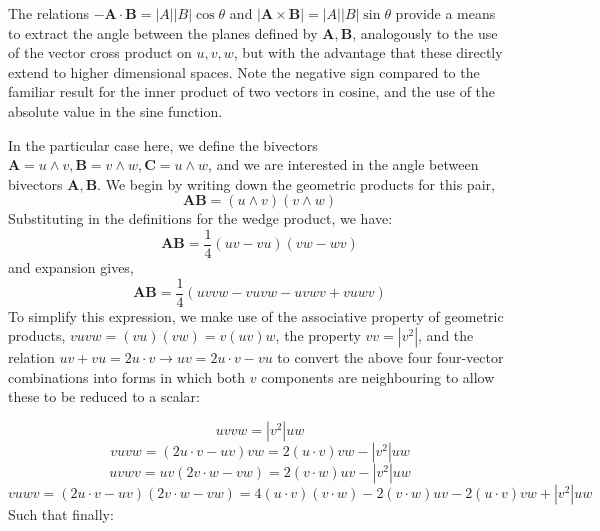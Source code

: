 \documentclass[11pt]{article} %
\begin{document}
The relations $ - \mathbf{A} \cdot \mathbf{B} = |A| |B| \cos \theta$ and  $  | \mathbf{A} \times \mathbf{B}| = |A| |B| \sin \theta$ provide a means to extract the angle between the planes defined by $\mathbf{A}, \mathbf{B}$, analogously to the use of the vector cross product on $u,v,w$, but with the advantage that these directly extend to higher dimensional spaces.  Note the negative sign compared to the familiar result for the inner product of two vectors in cosine, and the use of the absolute value in the sine function. 

In the particular case here, we define the bivectors $\mathbf{A} = u \wedge v, \mathbf{B} = v \wedge w, \mathbf{C} = u \wedge w$, and we are interested in the angle between bivectors $\mathbf{A}, \mathbf{B}$. We begin by writing down the geometric products for this pair,
\begin{equation}
\mathbf{A} \mathbf{B} = (u \wedge v) (v \wedge w) 
\end{equation}
Substituting in the definitions for the wedge product, we have:
\begin{equation}
\mathbf{A} \mathbf{B} = \frac{1}{4} (uv - vu) (vw - wv) 
\end{equation}
and expansion gives,
\begin{equation}
\mathbf{A} \mathbf{B} = \frac{1}{4}  (uvvw - vuvw - uvwv + vuwv)  
\end{equation}
To simplify this expression, we make use of the associative property of geometric products, $vuvw = (vu)(vw) = v(uv)w$, the property $vv = |v^2|$, and the relation $uv + vu = 2 u \cdot v \rightarrow uv = 2 u \cdot v - vu$  to convert the above four four-vector combinations into forms in which both $v$ components are neighbouring to allow these to be reduced to a scalar:

\begin{equation}
uvvw = |v^2| u w
\end{equation}
\begin{equation}
vuvw = (2 u \cdot v - uv )  vw = 2 (u \cdot v)  vw  - |v^2| uw   
\end{equation}
\begin{equation}
uvwv = uv( 2 v\cdot w - vw) =   2(  v\cdot w) uv - |v^2| u w
\end{equation}
\begin{equation}
vuwv = (2 u \cdot v - uv)( 2 v \cdot w - vw) = 4 (u \cdot v ) ( v \cdot w) -2 (v \cdot w) uv - 2 ( u \cdot v) vw + |v^2| uw
\end{equation}
Such that finally: 
\end{document}
